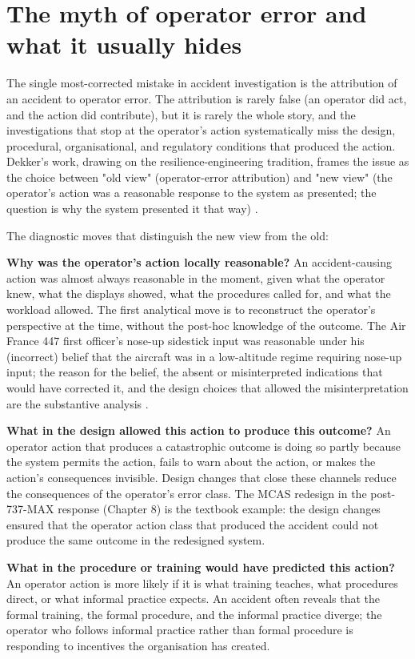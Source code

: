 \section{The myth of operator error and what it usually hides}

The single most-corrected mistake in accident investigation is the attribution of an accident to operator error. The attribution is rarely false (an operator did act, and the action did contribute), but it is rarely the whole story, and the investigations that stop at the operator's action systematically miss the design, procedural, organisational, and regulatory conditions that produced the action. Dekker's work, drawing on the resilience-engineering tradition, frames the issue as the choice between "old view" (operator-error attribution) and "new view" (the operator's action was a reasonable response to the system as presented; the question is why the system presented it that way) \cite{text:dekker2014}.

The diagnostic moves that distinguish the new view from the old:

\textbf{Why was the operator's action locally reasonable?} An accident-causing action was almost always reasonable in the moment, given what the operator knew, what the displays showed, what the procedures called for, and what the workload allowed. The first analytical move is to reconstruct the operator's perspective at the time, without the post-hoc knowledge of the outcome. The Air France 447 first officer's nose-up sidestick input was reasonable under his (incorrect) belief that the aircraft was in a low-altitude regime requiring nose-up input; the reason for the belief, the absent or misinterpreted indications that would have corrected it, and the design choices that allowed the misinterpretation are the substantive analysis \cite{acc:bea-af447}.

\textbf{What in the design allowed this action to produce this outcome?} An operator action that produces a catastrophic outcome is doing so partly because the system permits the action, fails to warn about the action, or makes the action's consequences invisible. Design changes that close these channels reduce the consequences of the operator's error class. The MCAS redesign in the post-737-MAX response (Chapter 8) is the textbook example: the design changes ensured that the operator action class that produced the accident could not produce the same outcome in the redesigned system.

\textbf{What in the procedure or training would have predicted this action?} An operator action is more likely if it is what training teaches, what procedures direct, or what informal practice expects. An accident often reveals that the formal training, the formal procedure, and the informal practice diverge; the operator who follows informal practice rather than formal procedure is responding to incentives the organisation has created.

